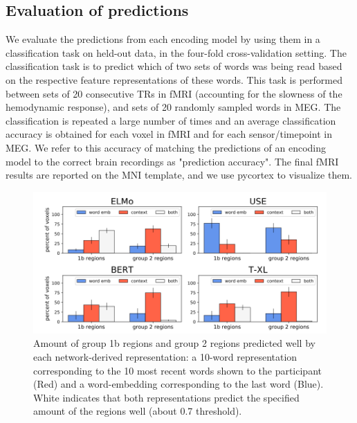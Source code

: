 \documentclass{article}
\begin{document}
\subsection{Evaluation of predictions}
We evaluate the predictions from each encoding model by using them in
a classification task on held-out data, in the four-fold cross-validation setting. The classification task is to predict which of two sets of words was being read based on the respective feature representations of these words\cite{wehbe2014simultaneously,wehbe2014aligning}. This task is performed between sets of 20 consecutive TRs in fMRI (accounting for the slowness of the hemodynamic response), and sets of 20 randomly sampled words in MEG. The classification is repeated a large number of times and an average classification accuracy is obtained for each voxel in fMRI and for each sensor/timepoint in MEG. We refer to this accuracy of matching the predictions of an encoding model to the correct brain recordings as "prediction accuracy". The final fMRI results are reported on the MNI template, and we use pycortex to visualize them\cite{gao2015pycortex}. 

\begin{figure}[t]
\centering
\includegraphics[width=1.1\columnwidth]{pycortex.png}
\caption{Amount of group 1b regions and group 2 regions predicted well by each network-derived representation: a 10-word representation corresponding to the 10 most recent words shown to the participant (Red) and a word-embedding corresponding to the last word (Blue). White indicates that both representations predict the specified amount of the regions well (about 0.7 threshold).\label{fig:pycortex}}
\end{figure}
\end{document}
